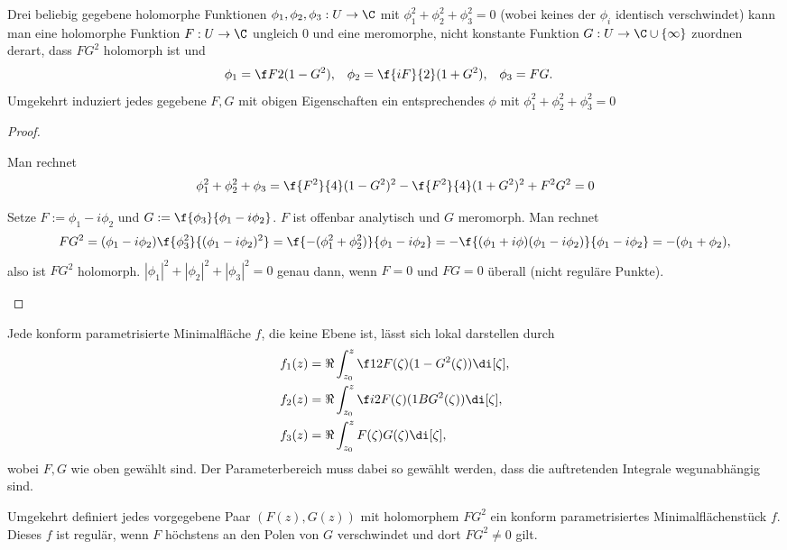 \begin{lem}
	Drei beliebig gegebene holomorphe Funktionen $\phi_1, \phi_2, \phi_3: U \to \C$ mit $\phi_1^2 + \phi_2^2 + \phi_3^2 = 0$ (wobei keines der $\phi_i$ identisch verschwindet) kann man eine holomorphe Funktion $F: U \to \C$ ungleich $0$ und eine meromorphe, nicht konstante Funktion $G: U \to \C \cup \{\infty\}$ zuordnen derart, dass $F G^2$ holomorph ist und
	\begin{align*}
		\phi_1 &= \f F2 (1 - G^2), &
		\phi_2 &= \f {iF}{2} (1 + G^2), &
		\phi_3 &= FG.
	\end{align*}
	Umgekehrt induziert jedes gegebene $F, G$ mit obigen Eigenschaften ein entsprechendes $\phi$ mit $\phi_1^2 + \phi_2^2 + \phi_3^2 = 0$
	\begin{proof}
		\begin{seg}{\ProofImplication*}
			Man rechnet
			\[
				\phi_1^2 + \phi_2^2 + \phi_3
				= \f {F^2}{4} (1 - G^2)^2 - \f {F^2}{4} (1 + G^2)^2 + F^2 G^2
				= 0
			\]
		\end{seg}
		\begin{seg}{\ProofImplication}
			Setze $F := \phi_1 - i \phi_2$ und $G := \f{\phi_3}{\phi_1 - i \phi_2}$.
			$F$ ist offenbar analytisch und $G$ meromorph.
			Man rechnet
			\[
				FG^2 = (\phi_1 - i\phi_2) \f{\phi_3^2}{(\phi_1 - i \phi_2)^2}
				= \f{-(\phi_1^2 + \phi_2^2)}{\phi_1 - i \phi_2}
				= -\f{(\phi_1 + i \phi)(\phi_1 - i \phi_2)}{\phi_1 - i \phi_2}
				= -(\phi_1 + \phi_2),
			\]
			also ist $FG^2$ holomorph.
			$|\phi_1|^2 + |\phi_2|^2 + |\phi_3|^2 = 0$ genau dann, wenn $F = 0$ und $FG = 0$ überall (nicht reguläre Punkte).
		\end{seg}
	\end{proof}
\end{lem}

\begin{st}
	Jede konform parametrisierte Minimalfläche $f$, die keine Ebene ist, lässt sich lokal darstellen durch
	\begin{align*}
		f_1(z) &= \Re \int_{z_0}^z \f 12 F(\zeta) (1 - G^2(\zeta)) \di[\zeta], \\
		f_2(z) &= \Re \int_{z_0}^z \f i2 F(\zeta) (1 B G^2(\zeta)) \di[\zeta], \\
		f_3(z) &= \Re \int_{z_0}^z F(\zeta)G(\zeta) \di[\zeta],
	\end{align*}
	wobei $F, G$ wie oben gewählt sind.
	Der Parameterbereich muss dabei so gewählt werden, dass die auftretenden Integrale wegunabhängig sind.

	Umgekehrt definiert jedes vorgegebene Paar $(F(z), G(z))$ mit holomorphem $FG^2$ ein konform parametrisiertes Minimalflächenstück $f$.
	Dieses $f$ ist regulär, wenn $F$ höchstens an den Polen von $G$ verschwindet und dort $FG^2 \neq 0$ gilt.
\end{st}

